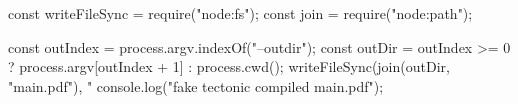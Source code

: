 const { writeFileSync } = require("node:fs");
const { join } = require("node:path");

const outIndex = process.argv.indexOf("--outdir");
const outDir = outIndex >= 0 ? process.argv[outIndex + 1] : process.cwd();
writeFileSync(join(outDir, "main.pdf"), "%
console.log("fake tectonic compiled main.pdf");
